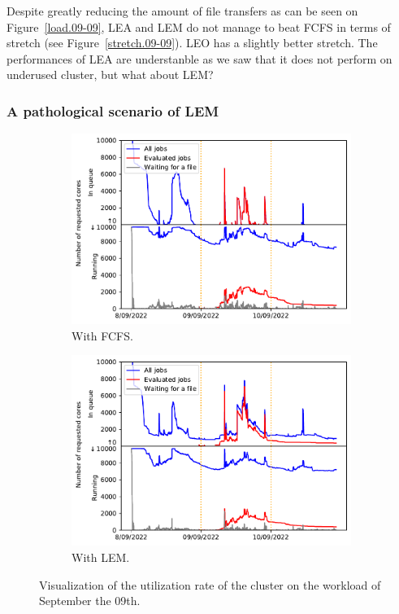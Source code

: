 \documentclass[conference,10pt]{IEEEtran}
\begin{document}
Despite greatly reducing the amount of file transfers as can be seen on Figure~\ref{load.09-09}, LEA and LEM
do not manage to beat FCFS in terms of stretch (see Figure~\ref{stretch.09-09}). LEO has a slightly better stretch.
The performances of LEA are understanble as we saw that it does not perform on underused cluster, but what about LEM?

\subsubsection{A pathological scenario of LEM}

\begin{figure}[tb]
\begin{subfigure}[b]{0.49\linewidth}\centering\includegraphics[width=1\linewidth]{../MBSS/plot/Cluster_usage/2022-09-09->2022-09-09_V10000_Fcfs_Used_nodes_Reduced_450_128_32_256_4_1024_core_by_core.pdf}\caption{With FCFS.}\label{cluster_09-09_fcfs}\end{subfigure}
\begin{subfigure}[b]{0.49\linewidth}\centering\includegraphics[width=1\linewidth]{../MBSS/plot/Cluster_usage/2022-09-09->2022-09-09_V10000_Fcfs_with_a_score_mixed_strategy_x500_x1_x0_x0_Used_nodes_Reduced_450_128_32_256_4_1024_core_by_core.pdf}\caption{With LEM.}\label{cluster_09-09_lem}
\end{subfigure}
\caption{Visualization of the utilization rate of the cluster on the workload of September the 09th.}\end{figure}
\end{document}
